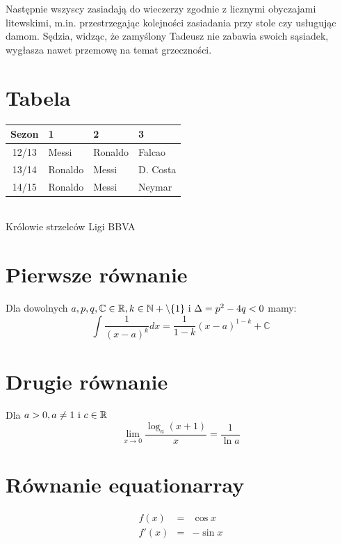 \documentclass[12pt]{article}
\begin{document}
Następnie wszyscy zasiadają do wieczerzy zgodnie z licznymi obyczajami litewskimi, m.in. przestrzegając kolejności zasiadania przy stole czy usługując damom. 
Sędzia, widząc, że zamyślony Tadeusz nie zabawia swoich sąsiadek, wygłasza nawet przemowę na temat grzeczności. 

\newpage

\section{Tabela }
\begin{center}
\begin{tabular}{|c||l|l|l|}
\hline Sezon & 1 & 2 & 3 \\ \hline \hline
12/13 & Messi & Ronaldo & Falcao \\
13/14 & Ronaldo & Messi & D. Costa \\
14/15 & Ronaldo & Messi & Neymar \\ \hline
\end{tabular}\\
\vspace{7mm}
Królowie strzelców Ligi BBVA
\end{center}

\section{Pierwsze równanie} 
Dla dowolnych
\begin{math}
a,p,q,\mathbb{C} \in \mathbb{R}, k \in \mathbb{N} + 
\backslash\{1\}$ i $\Delta = p^2 - 4q < 0
\end{math} mamy:
\begin{equation}
{\int\frac{1}{(x-a)^k}dx} = \frac{1}{1-k}(x-a)^{1-k}+ \mathbb{C}
\label{pierwsze}
\end{equation}

\section{Drugie równanie} 
Dla
\begin{math}
a > 0, a \neq 1$ i $ c \in \mathbb{R}
\end{math}
\begin{equation}
\lim_{x \to 0} \frac{\log_a(x+1)}{x}=\frac{1}{\ln a}
\label{drugie}
\end{equation}

\section{Równanie equationarray}
\begin{eqnarray*}
f(x) & = & \cos x \\
f'(x) & = & -\sin x \\
\end{eqnarray*}
\end{document}
